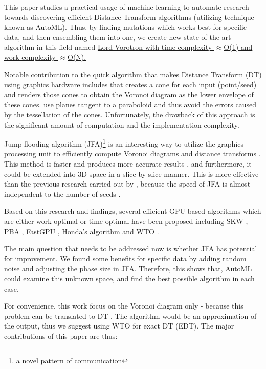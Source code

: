 \documentclass{article}
\newcommand{\citep}[1]{\citeauthor*{#1} \cite{#1}} %
\newcommand{\ourjfa}{Lord Vorotron} %
\begin{document}
This paper studies a practical usage of machine learning to automate research
towards discovering efficient Distance Transform algorithms (utilizing technique known as AutoML).
Thus, by finding mutations which works best for specific data, and then ensembling them into
one, we create new state-of-the-art algorithm in this field named \uline{\ourjfa \hspace{0.01cm} with
time complexity $\approx$O(1) and work complexity $\approx$O(N).}

Notable contribution to the quick algorithm that makes Distance Transform (DT)
using graphics hardware includes \citep{hoff1999fast} that creates a cone for
each input (point/seed) and renders those cones to obtain the Voronoi diagram as the lower envelope of these cones.
\cite{fischer2006fast} use planes tangent to a paraboloid and thus avoid the errors caused by the tessellation of the cones.
Unfortunately, the drawback of this approach is the significant amount of computation and the implementation complexity.

Jump flooding algorithm (JFA)\footnote{a novel pattern of
communication} is an interesting way to utilize the graphics processing unit to
efficiently compute Voronoi diagrams and distance transforms
\cite{rong2006jump}. This method is faster and produces more accurate results
\cite{rong2007variants}, and furthermore, it could be extended into 3D space in a slice-by-slice manner.
This is more effective than the previous research carried out by
\citep{sud2006interactive}, because the speed of JFA is almost independent to the number of seeds \cite{rong2007variants}.

Based on this research and findings, several efficient GPU-based algorithms which are either
work optimal or time optimal have been proposed including
SKW \cite{schneider2009gpu}, PBA \cite{cao2010parallel}, FastGPU \cite{de2017fast}, Honda's algorithm \cite{honda2017simple} and
WTO \cite{manduhu2019work}.

The main question that needs to be addressed now is whether JFA has potential
for improvement. We found some benefits for specific data by adding random noise
and adjusting the phase size in JFA. Therefore, this shows that, AutoML could examine this
unknown space, and find the best possible algorithm in each case.

For convenience, this work focus on the Voronoi diagram only - because this problem can be translated to DT \cite{rong2006jump}.
The algorithm would be an approximation of the output, thus we suggest using WTO
\cite{manduhu2019work} for exact DT (EDT). The major contributions of this paper are thus:
\end{document}
